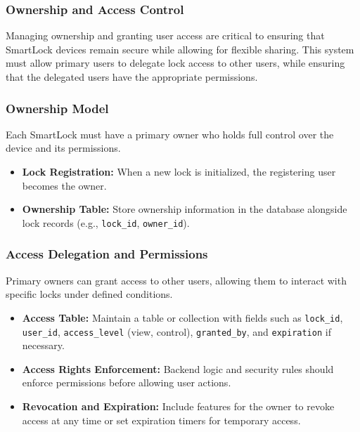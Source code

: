 \subsubsection{Ownership and Access Control}

Managing ownership and granting user access are critical to ensuring that SmartLock devices remain secure while allowing for flexible sharing. This system must allow primary users to delegate lock access to other users, while ensuring that the delegated users have the appropriate permissions.

\subsubsection*{Ownership Model}

Each SmartLock must have a primary owner who holds full control over the device and its permissions.

\begin{itemize}
  \item \textbf{Lock Registration:} When a new lock is initialized, the registering user becomes the owner.
  \item \textbf{Ownership Table:} Store ownership information in the database alongside lock records (e.g., \texttt{lock\_id}, \texttt{owner\_id}).
\end{itemize}

\subsubsection*{Access Delegation and Permissions}

Primary owners can grant access to other users, allowing them to interact with specific locks under defined conditions.

\begin{itemize}
  \item \textbf{Access Table:} Maintain a table or collection with fields such as \texttt{lock\_id}, \texttt{user\_id}, \texttt{access\_level} (view, control), \texttt{granted\_by}, and \texttt{expiration} if necessary.
  \item \textbf{Access Rights Enforcement:} Backend logic and security rules should enforce permissions before allowing user actions.
  \item \textbf{Revocation and Expiration:} Include features for the owner to revoke access at any time or set expiration timers for temporary access.
\end{itemize}

